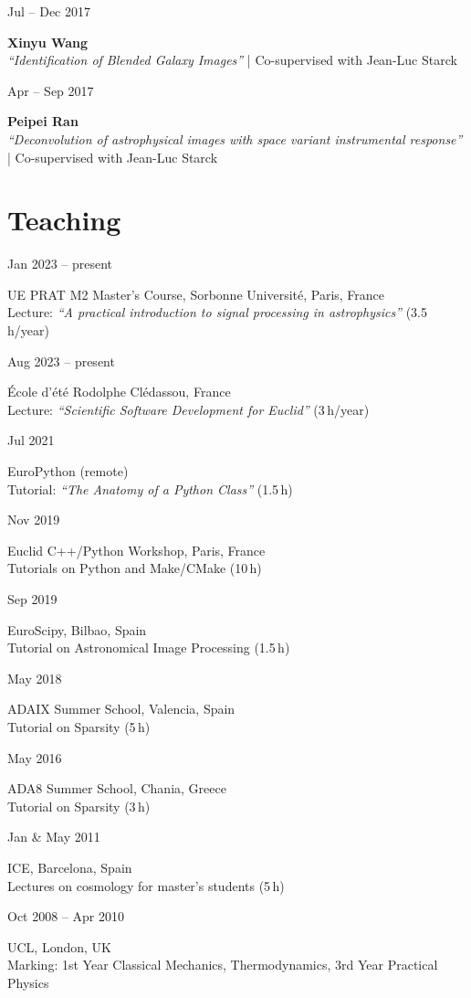 \documentclass[a4paper,10pt]{article}
\newlength{\cvdatew}
\newcommand{\cvline}[2]{%
  \vspace{2pt}%
  \noindent\begin{minipage}[t]{\cvdatew}%
    \raggedright\small\color{muted}#1%
  \end{minipage}%
  \hspace{0.6em}%
  \begin{minipage}[t]{\dimexpr\linewidth-\cvdatew-0.6em\relax}%
    #2%
  \end{minipage}%
  \vspace{2pt}%
}
\begin{document}
\cvline{Jul -- Dec 2017}{\textbf{Xinyu Wang}\\
  {\small\color{muted}\textit{``Identification of Blended Galaxy Images''} | Co-supervised with Jean-Luc Starck}}

\cvline{Apr -- Sep 2017}{\textbf{Peipei Ran}\\
  {\small\color{muted}\textit{``Deconvolution of astrophysical images with space variant instrumental response''} | Co-supervised with Jean-Luc Starck}}

\section{Teaching}

\cvline{Jan 2023 -- present}{UE PRAT M2 Master's Course, Sorbonne Universit\'e, Paris, France\\
  {\small\color{muted}Lecture: \textit{``A practical introduction to signal processing in astrophysics''} (3.5\,h/year)}}

\cvline{Aug 2023 -- present}{\'Ecole d'\'et\'e Rodolphe Cl\'edassou, France\\
  {\small\color{muted}Lecture: \textit{``Scientific Software Development for Euclid''} (3\,h/year)}}

\cvline{Jul 2021}{EuroPython (remote)\\
  {\small\color{muted}Tutorial: \textit{``The Anatomy of a Python Class''} (1.5\,h)}}

\cvline{Nov 2019}{Euclid C++/Python Workshop, Paris, France\\
  {\small\color{muted}Tutorials on Python and Make/CMake (10\,h)}}

\cvline{Sep 2019}{EuroScipy, Bilbao, Spain\\
  {\small\color{muted}Tutorial on Astronomical Image Processing (1.5\,h)}}

\cvline{May 2018}{ADAIX Summer School, Valencia, Spain\\
  {\small\color{muted}Tutorial on Sparsity (5\,h)}}

\cvline{May 2016}{ADA8 Summer School, Chania, Greece\\
  {\small\color{muted}Tutorial on Sparsity (3\,h)}}

\cvline{Jan \& May 2011}{ICE, Barcelona, Spain\\
  {\small\color{muted}Lectures on cosmology for master's students (5\,h)}}

\cvline{Oct 2008 -- Apr 2010}{UCL, London, UK\\
  {\small\color{muted}Marking: 1st Year Classical Mechanics, Thermodynamics, 3rd Year Practical Physics}}
\end{document}
